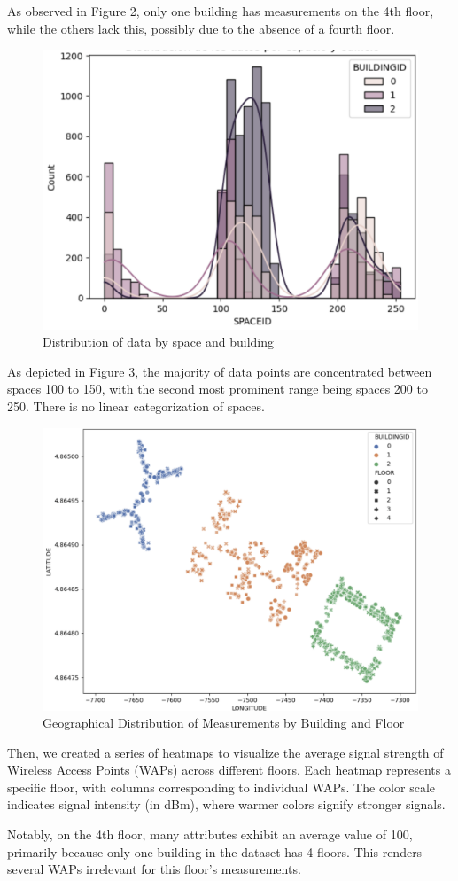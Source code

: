 \documentclass[conference]{IEEEtran}
\begin{document}
As observed in Figure 2, only one building has measurements on the 4th floor, while the others lack this, possibly due to the absence of a fourth floor.

\begin{figure}[h!]
    \centering
    \includegraphics[width=0.5\linewidth]{Images/Image3.png}
    \caption{Distribution of data by space and building}
    \label{fig:enter-label}
\end{figure}

As depicted in Figure 3, the majority of data points are concentrated between spaces 100 to 150, with the second most prominent range being spaces 200 to 250. There is no linear categorization of spaces.


\begin{figure}[h!]
    \centering
    \includegraphics[width=0.5\linewidth]{Images/Figure4.png}
    \caption{Geographical Distribution of Measurements by Building and Floor}
    \label{fig:enter-label}
\end{figure}


Then, we created a series of heatmaps to visualize the average signal strength of Wireless Access Points (WAPs) across different floors. Each heatmap represents a specific floor, with columns corresponding to individual WAPs. The color scale indicates signal intensity (in dBm), where warmer colors signify stronger signals.

Notably, on the 4th floor, many attributes exhibit an average value of 100, primarily because only one building in the dataset has 4 floors. This renders several WAPs irrelevant for this floor's measurements.
\end{document}
